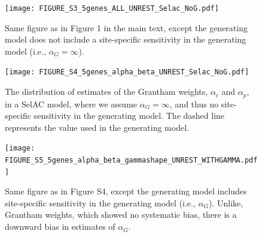 \documentclass[onecolumn,letterpaper,fleqn,nogrid]{myMBE}%
\newcommand{\alphac}{\ensuremath{\alpha_c}\xspace}
\newcommand{\alphag}{\ensuremath{\alpha_G}\xspace}
\newcommand{\alphap}{\ensuremath{\alpha_p}\xspace}
\begin{document}
\begin{figure}[H]
  \centering
  \texttt{[image: FIGURE\_S3\_5genes\_ALL\_UNREST\_Selac\_NoG.pdf]}
  \caption{Same figure as in Figure 1 in the main text, except the generating model does not include a site-specific sensitivity in the generating model (i.e., $\alphag = \infty$).
}
  \label{fig:SelacNoGSimRes}
\end{figure}

\begin{figure}[H]
  \centering
  \texttt{[image: FIGURE\_S4\_5genes\_alpha\_beta\_UNREST\_Selac\_NoG.pdf]}
  \caption{The distribution of estimates of the Grantham weights, $\alphac$ and $\alphap$, in a SelAC model, where we assume $\alphag = \infty$, and thus no site-specific sensitivity in the generating model.
                The dashed line represents the value used in the generating model.
  }
  \label{fig:SelacNoGSimRes2}
\end{figure}


\begin{figure}[H]
  \centering
  \texttt{[image: FIGURE\_S5\_5genes\_alpha\_beta\_gammashape\_UNREST\_WITHGAMMA.pdf]}
  \caption{Same figure as in Figure S4, except the generating model includes site-specific sensitivity in the generating model (i.e., $\alphag$).
                Unlike, Grantham weights, which showed no systematic bias, there is a downward bias in estimates of $\alphag$.
  }
  \label{fig:SelacWithGSimRes2}
\end{figure}
\end{document}
